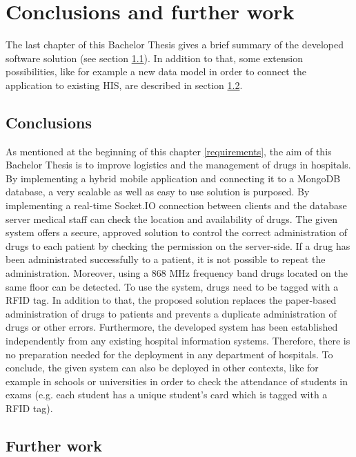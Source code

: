 \chapter{Conclusions and further work}
\label{Kap5}

The last chapter of this Bachelor Thesis gives a brief summary of the developed software solution (see section \ref{conclusion}). In addition to that, some extension possibilities, like for example a new data model in order to connect the application to existing HIS, are described in section \ref{furtherwork}. 

\section{Conclusions} \label{conclusion}

As mentioned at the beginning of this chapter \ref{requirements}, the aim of this Bachelor Thesis is to improve logistics and the management of drugs in hospitals. By implementing a hybrid mobile application and connecting it to a MongoDB database, a very scalable as well as easy to use solution is purposed.
By implementing a real-time Socket.IO connection between clients and the database server medical staff can check the location and availability of drugs.
The given system offers a secure, approved solution to control the correct administration of drugs to each patient by checking the permission on the server-side. If a drug has been administrated successfully to a patient, it is not possible to repeat the administration. 
Moreover, using a 868 MHz frequency band drugs located on the same floor can be detected. To use the system, drugs need to be tagged with a RFID tag. 
In addition to that, the proposed solution replaces the paper-based administration of drugs to patients and prevents a duplicate administration of drugs or other errors.
Furthermore, the developed system has been established independently from any existing hospital information systems. Therefore, there is no preparation needed for the deployment in any department of hospitals.
To conclude, the given system can also be deployed in other contexts, like for example in schools or universities in order to check the attendance of students in exams (e.g. each student has a unique student's card which is tagged with a RFID tag).

\section{Further work} \label{furtherwork}

